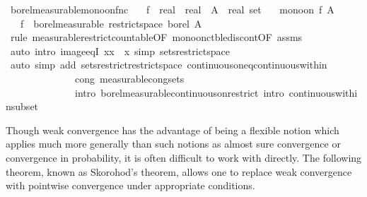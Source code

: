 \documentclass[leqno]{article}
\theoremstyle{definition}
\begin{document}
\begin{isabellebody}
\isamarkupfalse%
\ borel{\isacharunderscore}measurable{\isacharunderscore}mono{\isacharunderscore}on{\isacharunderscore}fnc{\isacharcolon}\isanewline
\ \ \ f\ {\isacharcolon}{\isacharcolon}\ {\isachardoublequoteopen}real\ {\isasymRightarrow}\ real{\isachardoublequoteclose}\ \ A\ {\isacharcolon}{\isacharcolon}\ {\isachardoublequoteopen}real\ set{\isachardoublequoteclose}\isanewline
\ \ \ {\isachardoublequoteopen}mono{\isacharunderscore}on\ f\ A{\isachardoublequoteclose}\isanewline
\ \ \ {\isachardoublequoteopen}f\ {\isasymin}\ borel{\isacharunderscore}measurable\ {\isacharparenleft}restrict{\isacharunderscore}space\ borel\ A{\isacharparenright}{\isachardoublequoteclose}\isanewline
{}\isamarkupfalse%
\ {\isacharparenleft}rule\ measurable{\isacharunderscore}restrict{\isacharunderscore}countable{\isacharbrackleft}OF\ mono{\isacharunderscore}on{\isacharunderscore}ctble{\isacharunderscore}discont{\isacharbrackleft}OF\ assms{\isacharbrackright}{\isacharbrackright}{\isacharparenright}\isanewline
\ \ \isamarkupfalse%
\ {\isacharparenleft}auto\ intro{\isacharbang}{\isacharcolon}\ image{\isacharunderscore}eqI{\isacharbrackleft}\ x{\isacharequal}{\isachardoublequoteopen}{\isacharbraceleft}x{\isacharbraceright}{\isachardoublequoteclose}\ \ x{\isacharbrackright}\ simp{\isacharcolon}\ sets{\isacharunderscore}restrict{\isacharunderscore}space{\isacharparenright}\isanewline
\ \ \isamarkupfalse%
\ {\isacharparenleft}auto\ simp\ add{\isacharcolon}\ sets{\isacharunderscore}restrict{\isacharunderscore}restrict{\isacharunderscore}space\ continuous{\isacharunderscore}on{\isacharunderscore}eq{\isacharunderscore}continuous{\isacharunderscore}within\isanewline
\ \ \ \ \ \ \ \ \ \ \ \ \ \ cong{\isacharcolon}\ measurable{\isacharunderscore}cong{\isacharunderscore}sets\ \isanewline
\ \ \ \ \ \ \ \ \ \ \ \ \ \ intro{\isacharbang}{\isacharcolon}\ borel{\isacharunderscore}measurable{\isacharunderscore}continuous{\isacharunderscore}on{\isacharunderscore}restrict\ intro{\isacharcolon}\ continuous{\isacharunderscore}within{\isacharunderscore}subset{\isacharparenright}\isanewline
\ \ \isamarkupfalse%
\end{isabellebody}

\medskip

Though weak convergence has the advantage of being a flexible notion which applies much more generally than such notions as almost sure convergence or convergence in probability, it is often difficult to work with directly. The following theorem, known as Skorohod's theorem, allows one to replace weak convergence with pointwise convergence under appropriate conditions.
\end{document}
